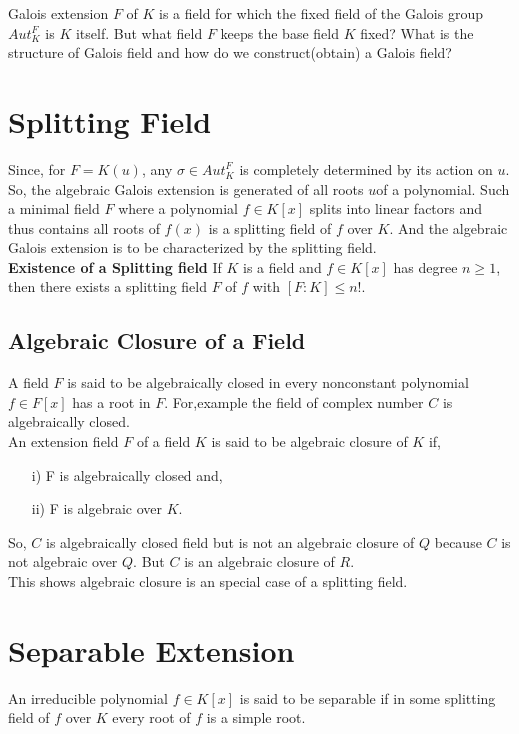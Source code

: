 Galois extension \(F\) of  \(K\) is a field for which the fixed field of the Galois group \(Aut_K^F\) is \(K\) itself.
But what field \(F\) keeps the base field \(K\) fixed? What is the structure of Galois field and how do we construct(obtain) a Galois field?


\section{Splitting Field}
Since, for \(F=K(u)\), any \(\sigma \in Aut_K^F\) is completely determined by its action on \(u\). So, the algebraic Galois extension is generated of all roots \(u\)of a polynomial. Such a minimal field \(F\) where a polynomial \(f \in K[x]\) splits into linear factors and thus contains all roots of \(f(x)\) is a splitting field of \(f\) over \(K\). And the algebraic Galois extension is to be characterized by the splitting field.\\[2mm]

\textbf{Existence of a Splitting field} \hspace{3mm}
If \(K\) is a field and \(f \in K[x]\) has degree \(n \geq 1\), then there exists a splitting field \(F\) of \(f\) with \([F:K] \leq n!\).

\subsection{Algebraic Closure of a Field}
A field \(F\) is said to be algebraically closed in every nonconstant polynomial \(f \in F[x]\) has a root in \(F\).
For,example the field of complex number \(C\) is algebraically closed.\\[2mm]

An extension field \(F\) of a field \(K\) is said to be algebraic closure of \(K\) if,
\begin{enumerate}
\item[i)] F is algebraically closed and,
  \item[ii)] F is algebraic over \(K\).
\end{enumerate}

So, \(C\) is algebraically closed field but is not an algebraic closure of \(Q\) because \(C\) is not algebraic over \(Q\).
But \(C\) is an algebraic closure of \(R\).\\

This shows algebraic closure is an special case of a splitting field.

\section{Separable Extension}
An irreducible polynomial \(f \in K[x]\) is said to be separable if in some splitting field of \(f\) over \(K\) every root of \(f\) is a simple root.\\[2mm]

